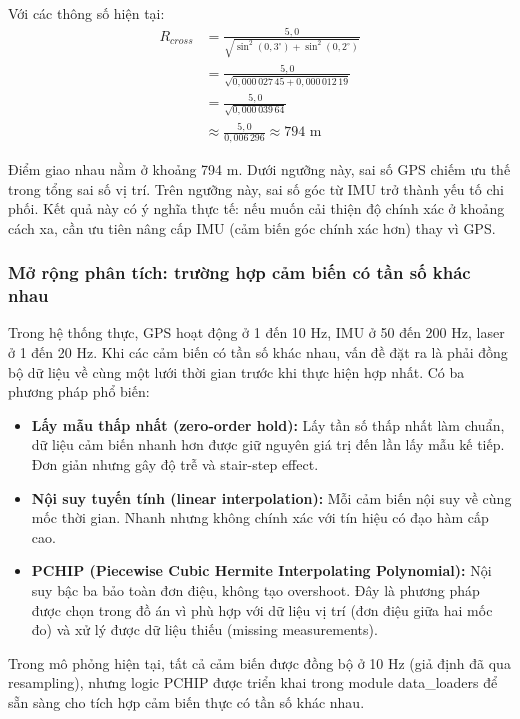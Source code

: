 Với các thông số hiện tại:
\begin{align*}
    R_{cross} &= \frac{5{,}0}{\sqrt{\sin^2(0{,}3^\circ) + \sin^2(0{,}2^\circ)}} \\
              &= \frac{5{,}0}{\sqrt{0{,}000\,027\,45 + 0{,}000\,012\,19}} \\
              &= \frac{5{,}0}{\sqrt{0{,}000\,039\,64}} \\
              &\approx \frac{5{,}0}{0{,}006\,296} \approx 794 \text{ m}
\end{align*}

Điểm giao nhau nằm ở khoảng 794 m. Dưới ngưỡng này, sai số GPS chiếm ưu thế trong tổng sai số vị trí. Trên ngưỡng này, sai số góc từ IMU trở thành yếu tố chi phối. Kết quả này có ý nghĩa thực tế: nếu muốn cải thiện độ chính xác ở khoảng cách xa, cần ưu tiên nâng cấp IMU (cảm biến góc chính xác hơn) thay vì GPS.

\subsubsection{Mở rộng phân tích: trường hợp cảm biến có tần số khác nhau}
\hspace{0.5cm} Trong hệ thống thực, GPS hoạt động ở 1 đến 10 Hz, IMU ở 50 đến 200 Hz, laser ở 1 đến 20 Hz. Khi các cảm biến có tần số khác nhau, vấn đề đặt ra là phải đồng bộ dữ liệu về cùng một lưới thời gian trước khi thực hiện hợp nhất. Có ba phương pháp phổ biến:

\begin{itemize}
    \item \textbf{Lấy mẫu thấp nhất (zero-order hold):} Lấy tần số thấp nhất làm chuẩn, dữ liệu cảm biến nhanh hơn được giữ nguyên giá trị đến lần lấy mẫu kế tiếp. Đơn giản nhưng gây độ trễ và stair-step effect.
    \item \textbf{Nội suy tuyến tính (linear interpolation):} Mỗi cảm biến nội suy về cùng mốc thời gian. Nhanh nhưng không chính xác với tín hiệu có đạo hàm cấp cao.
    \item \textbf{PCHIP (Piecewise Cubic Hermite Interpolating Polynomial):} Nội suy bậc ba bảo toàn đơn điệu, không tạo overshoot. Đây là phương pháp được chọn trong đồ án vì phù hợp với dữ liệu vị trí (đơn điệu giữa hai mốc đo) và xử lý được dữ liệu thiếu (missing measurements).
\end{itemize}

Trong mô phỏng hiện tại, tất cả cảm biến được đồng bộ ở 10 Hz (giả định đã qua resampling), nhưng logic PCHIP được triển khai trong module data\_loaders để sẵn sàng cho tích hợp cảm biến thực có tần số khác nhau.

